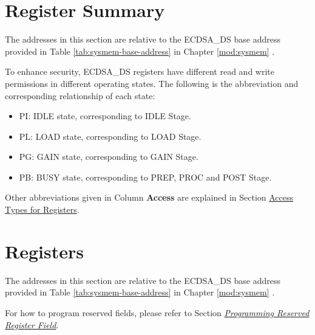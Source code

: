 \documentclass[main\_\_EN.tex]{subfiles}
\begin{document}


\clearpage
\hypertarget{ecdsa-reg-summ}{}
\section{Register Summary}
\label{sec:ecdsa-reg-summ}

The addresses in this section are relative to the ECDSA\_DS base address provided in Table \ref{tab:sysmem-base-address} in Chapter \ref{mod:sysmem} \textit{}.

To enhance security, ECDSA\_DS registers have different read and write permissions in different operating states. The following is the abbreviation and corresponding relationship of each state:

\begin{itemize}
    \item PI: IDLE state, corresponding to IDLE Stage.
    \item PL: LOAD state, corresponding to LOAD Stage.
    \item PG: GAIN state, corresponding to GAIN Stage.
    \item PB: BUSY state, corresponding to PREP, PROC and POST Stage.
\end{itemize}

Other abbreviations given in Column \textbf{Access} are explained in Section \hyperref[glossary-access-types]{Access Types for Registers}.






\clearpage
\section{Registers}

The addresses in this section are relative to the ECDSA\_DS base address provided in Table \ref{tab:sysmem-base-address} in Chapter \ref{mod:sysmem} \textit{}.

For how to program reserved fields, please refer to Section \hyperref[programming-reserved-field]{\textit{Programming Reserved Register Field}}.


\end{document}
